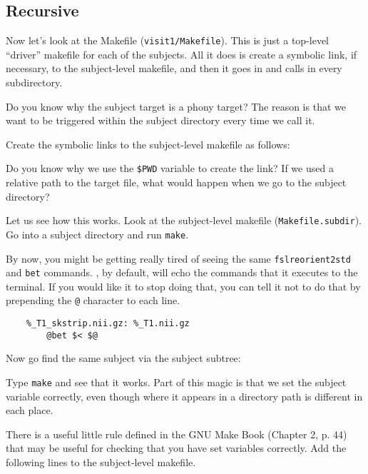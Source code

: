 \subsection{Recursive \maken{}}
Now let's look at the Makefile (\texttt{visit1/Makefile}).  This is just a 
top-level ``driver'' makefile for each of the subjects. All it does is
create a symbolic link, if necessary, to the subject-level makefile,
and then it goes in and calls \maken{} in every subdirectory.

Do you know why the subject target is a phony target? The reason is
that we want \maken{} to be triggered within the subject directory every
time we call it.

Create the symbolic links to the subject-level makefile as follows:

Do you know why we use the \texttt{\$PWD} variable to create the link?
If we used a relative path to the target file, what would happen when
we go to the subject directory?

Let us see how this works. Look at the subject-level makefile (\texttt{Makefile.subdir}). Go into
a subject directory and run \texttt{make}.

By now, you might be getting really tired of seeing the same \texttt{fslreorient2std} and \texttt{bet} commands. \maken{}, by default,
will echo the commands that it executes to the terminal. If you would
like it to stop doing that, you can tell it not to do that by
prepending the \texttt{@} character to each line.
\begin{lstlisting}
	%_T1_skstrip.nii.gz: %_T1.nii.gz
		@bet $< $@
\end{lstlisting}

Now go find the same subject via the subject subtree:

Type \texttt{make} and see that it works. Part of this magic is that we set
the subject variable correctly, even though where it appears in a
directory path is different in each place.

There is a useful little rule defined in the GNU Make Book (Chapter
2, p. 44) that may be useful for checking that you have set variables correctly. Add the following lines to the subject-level makefile.

